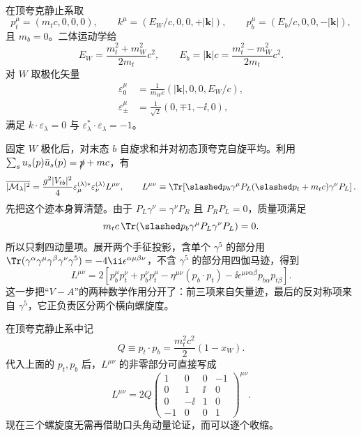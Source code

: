 \begin{derivation}
在顶夸克静止系取
\begin{equation*}
 p_t^\mu=(m_tc,0,0,0),
 \qquad
 k^\mu=\left(E_W/c,0,0,+|\mathbf k|\right),
 \qquad
 p_b^\mu=\left(E_b/c,0,0,-|\mathbf k|\right),
\end{equation*}
且 $m_b=0$。二体运动学给
\begin{equation*}
 E_W=\frac{m_t^2+m_W^2}{2m_t}c^2,
 \qquad
 E_b=|\mathbf k|c=\frac{m_t^2-m_W^2}{2m_t}c^2.
\end{equation*}
对 $W$ 取极化矢量
\begin{align*}
 \varepsilon_0^\mu
 &=\frac1{m_Wc}\left(|\mathbf k|,0,0,E_W/c\right),\\
 \varepsilon_\pm^\mu
 &=\frac1{\sqrt2}(0,\mp1,-\ii,0),
\end{align*}
满足 $k\cdot\varepsilon_\lambda=0$ 与 $\varepsilon_\lambda^*\cdot\varepsilon_\lambda=-1$。

固定 $W$ 极化后，对末态 $b$ 自旋求和并对初态顶夸克自旋平均。利用
\(\sum_su_s(p)\bar u_s(p)=\slashed p+mc\)，有
\begin{equation*}
 \overline{|\mathcal M_\lambda|^2}
 =\frac{g^2|V_{tb}|^2}{4}
 \varepsilon_{\mu}^{(\lambda)*}\varepsilon_\nu^{(\lambda)}
 L^{\mu\nu},
\qquad
 L^{\mu\nu}\equiv
 \Tr\!\left[
 \slashed p_b\gamma^\mu P_L(\slashed p_t+m_tc)
 \gamma^\nu P_L
 \right].
\end{equation*}
先把这个迹本身算清楚。由于
\(P_L\gamma^\nu=\gamma^\nu P_R\) 且 $P_RP_L=0$，质量项满足
\begin{equation*}
 m_tc\,\Tr(\slashed p_b\gamma^\mu P_L\gamma^\nu P_L)=0.
\end{equation*}
所以只剩四动量项。展开两个手征投影，含单个 $\gamma^5$ 的部分用
\(\Tr(\gamma^\alpha\gamma^\mu\gamma^\beta\gamma^\nu\gamma^5)
=-4\ii\epsilon^{\alpha\mu\beta\nu}\)，不含 $\gamma^5$ 的部分用四伽马迹，得到
\begin{equation*}
\boxed{
L^{\mu\nu}
=2\left[
 p_b^\mu p_t^\nu+p_b^\nu p_t^\mu
 -\eta^{\mu\nu}(p_b\cdot p_t)
 -\ii\epsilon^{\mu\nu\alpha\beta}p_{b\alpha}p_{t\beta}
 \right].}
\end{equation*}
这一步把“$V-A$”的两种数学作用分开了：前三项来自矢量迹，最后的反对称项来自 $\gamma^5$，它正负责区分两个横向螺旋度。

在顶夸克静止系中记
\begin{equation*}
 Q\equiv p_t\cdot p_b
 =\frac{m_t^2c^2}{2}(1-x_W).
\end{equation*}
代入上面的 $p_t,p_b$ 后，$L^{\mu\nu}$ 的非零部分可直接写成
\begin{equation*}
L^{\mu\nu}
=2Q
\begin{pmatrix}
 1&0&0&-1\\
 0&1&\ii&0\\
 0&-\ii&1&0\\
 -1&0&0&1
\end{pmatrix}^{\mu\nu}.
\end{equation*}
现在三个螺旋度无需再借助口头角动量论证，而可以逐个收缩。


\end{derivation}
